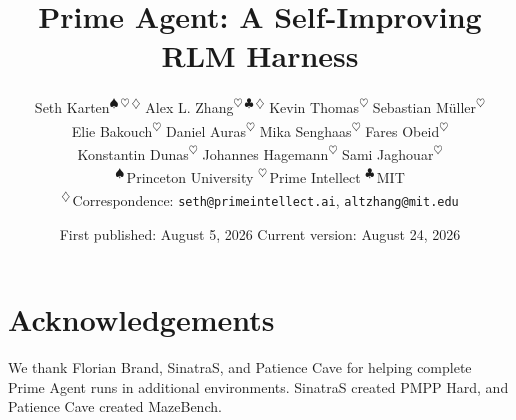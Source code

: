 \documentclass[11pt]{article}
\title{Prime Agent: A Self-Improving RLM Harness}
\author{
Seth Karten\textsuperscript{\(\spadesuit\,\heartsuit\,\diamondsuit\)} \quad
Alex L. Zhang\textsuperscript{\(\heartsuit\,\clubsuit\,\diamondsuit\)} \quad
Kevin Thomas\textsuperscript{\(\heartsuit\)} \quad
Sebastian M\"uller\textsuperscript{\(\heartsuit\)} \quad \\[0.2em]
Elie Bakouch\textsuperscript{\(\heartsuit\)} \quad
Daniel Auras\textsuperscript{\(\heartsuit\)} \quad
Mika Senghaas\textsuperscript{\(\heartsuit\)} \quad
Fares Obeid\textsuperscript{\(\heartsuit\)} \quad\\[0.2em]
Konstantin Dunas\textsuperscript{\(\heartsuit\)} \quad
Johannes Hagemann\textsuperscript{\(\heartsuit\)} \quad
Sami Jaghouar\textsuperscript{\(\heartsuit\)}\\[0.45em]
{\small \textsuperscript{\(\spadesuit\)}\,Princeton University \qquad \textsuperscript{\(\heartsuit\)}\,Prime Intellect \qquad \textsuperscript{\(\clubsuit\)}\,MIT}\\
{\small \textsuperscript{\(\diamondsuit\)}\,Correspondence: \texttt{seth@primeintellect.ai}, \texttt{altzhang@mit.edu}}
}
\date{First published: August 5, 2026 \quad\textbullet\quad Current version: August 24, 2026}
\begin{document}
\maketitle







\section*{Acknowledgements}
We thank Florian Brand, SinatraS, and Patience Cave for helping complete Prime Agent runs in additional environments.
SinatraS created PMPP Hard, and Patience Cave created MazeBench.



\appendix

\end{document}
